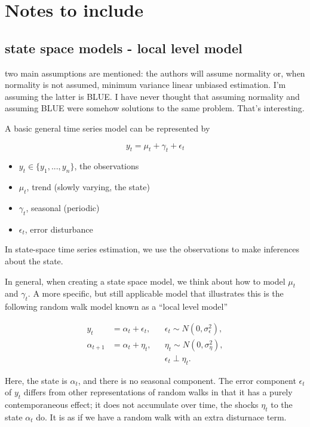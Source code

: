 \documentclass{tufte-book}
\begin{document}
\chapter{Notes to include}

\section{state space models - local level model}

two main assumptions are mentioned: the authors will assume normality or, when normality is not assumed, minimum variance linear unbiased estimation. I'm assuming the latter is BLUE. I have never thought that assuming normality and assuming BLUE were somehow solutions to the same problem. That's interesting.

A basic general time series model can be represented by 

\[
y_t = \mu_t + \gamma_t + \epsilon_t
\]

\begin{itemize}
    \item $y_t \in \{y_1, ..., y_n\}$, the observations
    \item $\mu_t$, trend (slowly varying, the state)
    \item $\gamma_t$, seasonal (periodic)
    \item $\epsilon_t$, error disturbance
\end{itemize}

In state-space time series estimation, we use the observations to make inferences about the state.

In general, when creating a state space model, we think about how to model $\mu_t$ and $\gamma_t$. A more specific, but still applicable model that illustrates this is the following random walk model known as a ``local level model''

\begin{align*}
y_t &= \alpha_t + \epsilon_t, &&\epsilon_t \sim N(0, \sigma_\epsilon^2), \\
\alpha_{t+1} &= \alpha_t + \eta_t, &&\eta_t \sim N(0, \sigma_\eta^2), \\
&   &&\epsilon_t \perp \eta_t.
\end{align*}

\noindent Here, the state is $\alpha_t$, and there is no seasonal component. The error component $\epsilon_t$ of $y_t$ differs from other representations of random walks in that it has a purely contemporaneous effect; it does not accumulate over time, the shocks $\eta_t$ to the state $\alpha_t$ do. It is as if we have a random walk with an extra disturnace term.
\end{document}
